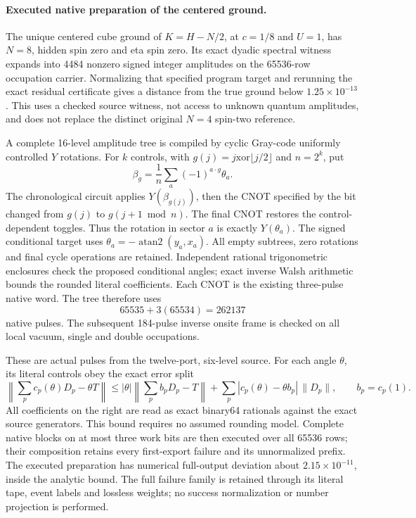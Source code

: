 \paragraph{Executed native preparation of the centered ground.}
The unique centered cube ground of $K=H-N/2$, at $c=1/8$ and $U=1$,
has $N=8$, hidden spin zero and eta spin zero. Its exact dyadic spectral
witness expands into 4484 nonzero signed integer amplitudes on the
65536-row occupation carrier. Normalizing that specified program target
and rerunning the exact residual certificate gives a distance from the
true ground below $1.25\times10^{-13}$. This uses a checked source
witness, not access to unknown quantum amplitudes, and does not replace
the distinct original $N=4$ spin-two reference.

A complete 16-level amplitude tree is compiled by cyclic Gray-code
uniformly controlled $Y$ rotations. For $k$ controls, with
$g(j)=j\mathbin{\mathrm{xor}}\lfloor j/2\rfloor$ and $n=2^k$, put
\[
 \beta_g=\frac1n\sum_a(-1)^{a\cdot g}\theta_a.
\]
The chronological circuit applies $Y(\beta_{g(j)})$, then the CNOT
specified by the bit changed from $g(j)$ to $g(j+1\bmod n)$.
The final CNOT restores the control-dependent toggles. Thus the rotation
in sector $a$ is exactly $Y(\theta_a)$. The signed conditional target
uses $\theta_a=-\operatorname{atan2}(y_a,x_a)$.
All empty subtrees, zero rotations and final cycle operations are
retained. Independent rational trigonometric enclosures check the
proposed conditional angles; exact inverse Walsh arithmetic bounds the
rounded literal coefficients. Each CNOT is the existing three-pulse
native word. The tree therefore uses
\[
 65535+3(65534)=262137
\]
native pulses. The subsequent 184-pulse inverse onsite frame is checked
on all local vacuum, single and double occupations.

These are actual pulses from the twelve-port, six-level source.
For each angle $\theta$, its literal controls obey the exact error split
\[
 \left\|\sum_p c_p(\theta)D_p-\theta T\right\|
 \leq |\theta|\left\|\sum_p b_pD_p-T\right\|
       +\sum_p|c_p(\theta)-\theta b_p|\,\|D_p\|,
 \qquad b_p=c_p(1).
\]
All coefficients on the right are read as exact binary64 rationals
against the exact source generators. This bound requires no assumed
rounding model. Complete native blocks on at most three work bits are
then executed over all 65536 rows; their composition retains every
first-export failure and its unnormalized prefix. The executed
preparation has numerical full-output deviation about
$2.15\times10^{-11}$, inside the analytic bound. The full failure family
is retained through its literal tape, event labels and lossless weights;
no success normalization or number projection is performed.

